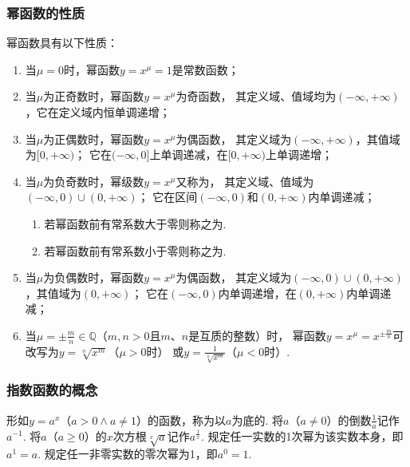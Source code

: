 \subsubsection{幂函数的性质}
\begin{property}
幂函数具有以下性质：
\begin{enumerate}
\item 当\(\mu = 0\)时，幂函数\(y=x^{\mu}=1\)是常数函数；

\item 当\(\mu\)为正奇数时，幂函数\(y=x^{\mu}\)为奇函数，%
其定义域、值域均为\((-\infty,+\infty)\)，它在定义域内恒单调递增；

\item 当\(\mu\)为正偶数时，幂函数\(y=x^{\mu}\)为偶函数，%
其定义域为\((-\infty,+\infty)\)，其值域为\([0,+\infty)\)；
它在\((-\infty,0]\)上单调递减，在\([0,+\infty)\)上单调递增；

\item 当\(\mu\)为负奇数时，幂级数\(y=x^{\mu}\)又称为，%
其定义域、值域为\((-\infty,0)\cup(0,+\infty)\)；
它在区间\((-\infty,0)\)和\((0,+\infty)\)内单调递减；
\begin{enumerate}
	\item 若幂函数前有常系数大于零则称之为.
	\item 若幂函数前有常系数小于零则称之为.
\end{enumerate}

\item 当\(\mu\)为负偶数时，幂函数\(y=x^{\mu}\)为偶函数，%
其定义域为\((-\infty,0)\cup(0,+\infty)\)，其值域为\((0,+\infty)\)；
它在\((-\infty,0)\)内单调递增，在\((0,+\infty)\)内单调递减；

\item 当\(\mu = \pm\frac{m}{n} \in \mathbb{Q}\)（\(m,n>0\)且\(m\)、\(n\)是互质的整数）时，%
幂函数\(y=x^{\mu}=x^{\pm\frac{m}{n}}\)可改写为\(y=\sqrt[n]{x^m}\)（\(\mu>0\)时）%
或\(y=\frac{1}{\sqrt[n]{x^m}}\)（\(\mu<0\)时）.
\end{enumerate}
\end{property}

\subsubsection{指数函数的概念}
\begin{definition}[指数函数]
形如\(y=a^x\)（\(a>0 \land a \neq 1\)）的函数，称为以\(a\)为底的.
将\(a\)（\(a \neq 0\)）的倒数\(\frac{1}{a}\)记作\(a^{-1}\).
将\(a\)（\(a \geqslant 0\)）的\(x\)次方根\(\sqrt[x]{a}\)记作\(a^{\frac{1}{x}}\).
规定任一实数的1次幂为该实数本身，即\(a^1=a\).
规定任一非零实数的零次幂为1，即\(a^0=1\).
\end{definition}

